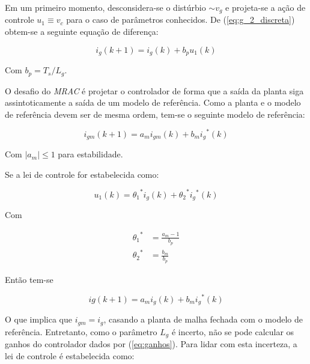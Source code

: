     Em um primeiro momento, desconsidera-se o distúrbio $\sim$$v_g$ e projeta-se
    a ação de controle $u_1 \equiv v_c$ para o caso de parâmetros conhecidos. De
    (\ref{eq:g_2_discreta}) obtem-se a seguinte equação de diferença:

    \begin{equation}
        i_g (k + 1) = i_g (k) + b_p u_1 (k)
        \label{eq:diferenca}
    \end{equation}

    Com $b_p = T_s / L_g$.

    O desafio do \textit{MRAC} é projetar o controlador de forma que a saída da
    planta siga assintoticamente a saída de um modelo de referência. Como a planta
    e o modelo de referência devem ser de mesma ordem, tem-se o seguinte modelo
    de referência:

    \begin{equation}
        i_{gm} (k + 1) = a_m i_{gm} (k) + b_m {i_g}^* (k)
        \label{eq:modelo_referencia}
    \end{equation}

    Com $| a_m | \le 1$ para estabilidade.

    Se a lei de controle for estabelecida como:

    \begin{equation}
        u_1 (k) = {\theta_1}^* i_g (k) + {\theta_2}^* {i_g}^* (k)
    \end{equation}

    Com

    \begin{subequations}
        \label{eq:ganhos}
        \begin{align}
            {\theta_1}^* & = \frac{a_m - 1}{b_p} \\
            {\theta_2}^* & = \frac{b_m}{b_p}
        \end{align}
    \end{subequations}

    Então tem-se

    \begin{equation}
        ig (k + 1) = a_m i_g (k) + b_m {i_g}^* (k)
    \end{equation}

    O que implica que $i_{gm} = i_g$, casando a planta de malha fechada com o
    modelo de referência. Entretanto, como o parâmetro $L_g$ é incerto, não se pode
    calcular os ganhos do controlador dados por (\ref{eq:ganhos}). Para lidar
    com esta incerteza, a lei de controle é estabelecida como:

